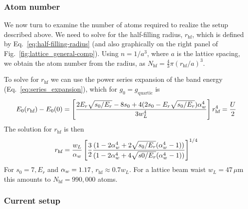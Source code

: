\subsubsection{Atom number}
 
We now turn to examine the number of atoms required to realize the setup
described above.  We need to solve for the half-filling radius,
$r_{\text{hf}}$, which is defined by Eq.~\ref{eq:half-filling-radius} (and also
graphically on the right panel of Fig.~\ref{fig:lattice_general-comp}).  Using
$n=1/a^{3}$, where $a$ is the lattice spacing, we obtain the atom number
from the radius, as $N_{\text{hf}} = \frac{4}{3} \pi (r_{\text{hf}}/a)^{3}$.  

To solve for $r_{\text{hf}}$ we can use the power series expansion of the band
energy (Eq.~\ref{eq:series_expansion}), which for $g_{0}=g_{\text{quartic}}$ is 
\begin{equation}
  E_{0}(r_{\text{hf}}) - E_{0}(0) = \left[  
  \frac{  2E_{r}\sqrt{s_{0}/E_{r}} - 8s_{0} 
   + 4( 2s_{0} -E_{r}\sqrt{s_{0}/E_{r}} )  \alpha_{w} ^{4} }
  { 3 w_{L}^{4} } \right] r_{\text{hf}}^{4} =  \frac{U}{2}  
\end{equation}
The solution for $r_{\text{hf}}$ is then 
\begin{equation}
  r_{\text{hf}} =  \frac{w_{L}}{ \alpha_{w} } \left[ 
  \frac{3}{2}  
  \frac{( 1 - 2 \alpha_{w} ^{4} + 2 \sqrt{s_{0}/E_{r}}(  \alpha_{w} ^{4} -1 ) )}
  { ( 1 -  2 \alpha_{w} ^{4} + 4 \sqrt{s0/E_{r}} (  \alpha_{w} ^{4} -1 ) ) } 
  \right]^{1/4} 
\end{equation}
For $s_{0}=7,E_{r}$ and $ \alpha_{w} =1.17$,  $r_{\text{hf}}\approx 0.7 w_{L}$.  For
a lattice beam waist $w_{L}=47\,\mu$m  this amounts to $N_{\text{hf}}=990,000$
atoms.    

% 


\subsubsection{Current setup} 

